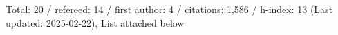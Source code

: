 Total: 20 / refereed: 14 / first author: 4 / citations: 1,586 / h-index: 13 (Last updated: 2025-02-22), List attached below